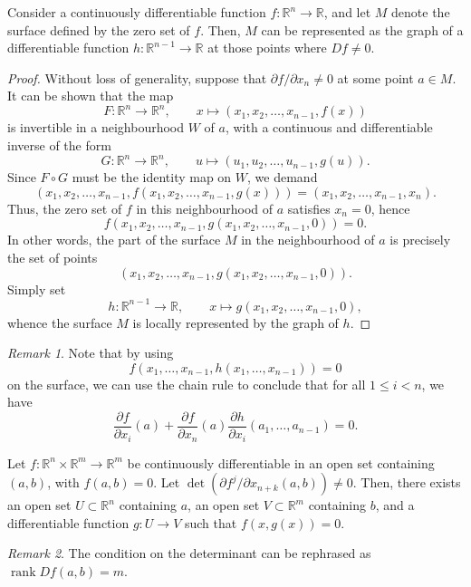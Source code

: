 \documentclass[11pt]{article}
\newcommand{\R}{\mathbb{R}}
\newcommand{\pp}[2]{\frac{\partial #1}{\partial #2}}
\theoremstyle{definition}
\theoremstyle{remark}
\newtheorem*{remark}{Remark}
\numberwithin{equation}{section}
\begin{document}
    \begin{lemma}
        Consider a continuously differentiable function $f\colon \R^n \to \R$, and
        let $M$ denote the surface defined by the zero set of $f$. Then, $M$ can be
        represented as the graph of a differentiable function $h\colon \R^{n - 1} \to
        \R$ at those points where $Df \neq 0$.
    \end{lemma}
    \begin{proof}
        Without loss of generality, suppose that $\partial f / \partial x_n \neq 0$
        at some point $a \in M$. It can be shown that the map \[
            F\colon \R^n \to \R^n , \qquad x \mapsto (x_1, x_2, \dots, x_{n - 1},
            f(x))
        \] is invertible in a neighbourhood $W$ of $a$, with a continuous and
        differentiable inverse of the form \[
            G\colon \R^n \to \R^n, \qquad u \mapsto (u_1, u_2, \dots, u_{n - 1},
            g(u)).
        \] Since $F\circ G$ must be the identity map on $W$, we demand \[
            (x_1, x_2, \dots, x_{n - 1}, f(x_1, x_2, \dots, x_{n - 1}, g(x))) = (x_1,
            x_2, \dots, x_{n - 1}, x_n).
        \] Thus, the zero set of $f$ in this neighbourhood of $a$ satisfies $x_n =
        0$, hence \[
            f(x_1, x_2, \dots, x_{n - 1}, g(x_1, x_2, \dots, x_{n - 1}, 0)) = 0.
        \] In other words, the part of the surface $M$ in the neighbourhood of $a$ is
        precisely the set of points \[
            (x_1, x_2, \dots, x_{n - 1}, g(x_1, x_2, \dots, x_{n - 1}, 0)).
        \] Simply set \[
            h\colon \R^{n - 1} \to \R, \qquad x \mapsto g(x_1, x_2, \dots, x_{n - 1},
            0),
        \] whence the surface $M$ is locally represented by the graph of $h$.
    \end{proof}
    \begin{remark}
        Note that by using \[
            f(x_1, \dots, x_{n - 1}, h(x_1, \dots, x_{n - 1})) = 0
        \] on the surface, we can use the chain rule to conclude that for all $1 \leq
        i < n$, we have \[
            \pp{f}{x_i}(a) + \pp{f}{x_n}(a)\pp{h}{x_i}(a_1, \dots, a_{n - 1}) = 0.
        \] 
    \end{remark}

    \begin{theorem}
        Let $f\colon \R^n\times \R^m \to \R^m$ be continuously differentiable in an
        open set containing $(a, b)$, with $f(a, b) = 0$. Let $\det(\partial f^j /
        \partial x_{n + k} (a, b)) \neq 0$. Then, there exists an open set $U \subset
        \R^n$ containing $a$, an open set $V \subset \R^m$ containing $b$, and a
        differentiable function $g\colon U \to V$ such that $f(x, g(x)) = 0$.

        \begin{remark}
            The condition on the determinant can be rephrased as
            $\operatorname{rank}{Df(a, b)} = m$.
        \end{remark}
    \end{theorem}
\end{document}
